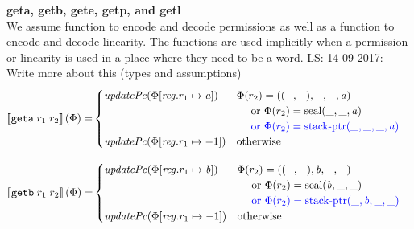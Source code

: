 \documentclass[a3paper]{article}
\newcommand\lau[1]{{\color{purple} \sf \footnotesize {LS: #1}}\\}
\newcommand{\sem}[1]{\left\llbracket #1 \right\rrbracket}
\newcommand{\tor}{\text{ or }}
\newcommand{\totherwise}{\text{otherwise }}
\newcommand{\sourcecolor}{\color{blue}}
\newcommand{\src}[1]{{\sourcecolor #1}}
\newcommand{\targetcolor}[1]{\color{black}}
\newcommand{\trg}[1]{{\targetcolor{} #1}}
\newcommand{\zinstr}[1]{\texttt{#1}}
\newcommand{\twoinstr}[3]{
  \ifthenelse{\equal{#2#3}{}}
  {\zinstr{#1}}
  {\zinstr{#1} \; #2 \; #3}
}
\newcommand{\tgeta}[2]{\twoinstr{\trg{geta}}{#1}{#2}}
\newcommand{\tgetb}[2]{\twoinstr{\trg{getb}}{#1}{#2}}
\newcommand{\update}[2]{[#1 \mapsto #2]}
\newcommand{\updReg}[2]{\update{\reg.#1}{#2}}
\newcommand{\shareddom}[1]{\mathrm{#1}}
\newcommand{\stkptr}[1]{\mathrm{stack\text{-}ptr}(#1)}
\newcommand{\seal}[1]{\shareddom{seal}(#1)}
\newcommand{\var}[1]{\mathit{#1}}
\newcommand{\reg}{\var{reg}}
\newcommand{\baddr}{\var{b}}
\newcommand{\aaddr}{\var{a}}
\newcommand{\plainfun}[2]{
  \ifthenelse{\equal{#2}{}}
  {\mathit{#1}}
  {\mathit{#1}(#2)}
}
\newcommand{\updPcAddr}[1]{\plainfun{updatePc}{#1}}
\begin{document}
\noindent\textbf{geta, getb, gete, getp, and getl}\\
We assume function to encode and decode permissions as well as a function to encode and decode linearity. The functions are used implicitly when a permission or linearity is used in a place where they need to be a word.
\lau{14-09-2017: Write more about this (types and assumptions)}
\begin{align*}
  \sem{\tgeta{r_1}{r_2}}(\Phi) = & 
                                   \begin{cases}
                                     \updPcAddr{\Phi\updReg{r_1}{\aaddr}} & 
                                     \arraycolsep=0pt
                                     \begin{array}[t]{l}
                                       \Phi(r_2) = ((\_,\_),\_,\_,\aaddr) \\
                                       \quad \tor \Phi(r_2) = \seal{\_,\_,\aaddr} \\
                                       \quad \src{\tor \Phi(r_2) = \stkptr{\_,\_,\_,\aaddr} } \\
                                     \end{array} \\
                                     \updPcAddr{\Phi\updReg{r_1}{-1}} & \totherwise
                                   \end{cases}
\end{align*}

\begin{align*}
  \sem{\tgetb{r_1}{r_2}}(\Phi) = & 
                                   \begin{cases}
                                     \updPcAddr{\Phi\updReg{r_1}{\baddr}} & 
                                     \arraycolsep=0pt
                                     \begin{array}[t]{l}
                                       \Phi(r_2) = ((\_,\_),\baddr,\_,\_) \\
                                       \quad \tor \Phi(r_2) = \seal{\baddr,\_,\_} \\
                                       \quad \src{\tor \Phi(r_2) = \stkptr{\_,\baddr,\_,\_} } \\
                                     \end{array} \\
                                     \updPcAddr{\Phi\updReg{r_1}{-1}} & \totherwise
                                   \end{cases}
\end{align*}
\end{document}
